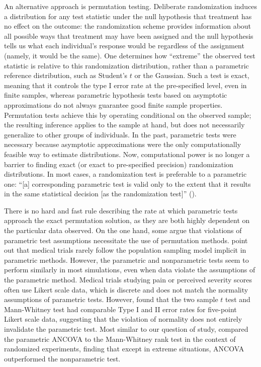 \documentclass[11pt]{article}
\newcommand{\todo}[1]{{\color{red}{TO DO: \sc #1}}}
\begin{document}
An alternative approach is permutation testing. \todo{citations: fisher 1935, pitman 1937 and 1938}
Deliberate randomization induces a distribution for any test statistic under the null hypothesis that treatment has no effect on the outcome:
the randomization scheme provides information about all possible ways that treatment may have been assigned 
and the null hypothesis tells us what each individual's response would be regardless of the assignment (namely, it would be the same).
One determines how ``extreme'' the observed test statistic is relative to this randomization distribution, rather than a parametric reference distribution, such as Student's $t$ or the Gaussian.
Such a test is exact, meaning that it controls the type I error rate at the pre-specified level, even in finite samples, whereas parametric hypothesis tests based on asymptotic approximations do not always guarantee good finite sample properties.
Permutation tests achieve this by operating conditional on the observed sample; the resulting inference applies to the sample at hand, but does not necessarily generalize to other groups of individuals.
In the past, parametric tests were necessary because asymptotic approximations were the only computationally feasible way to estimate distributions. 
Now, computational power is no longer a barrier to finding exact (or exact to pre-specified precision) randomization distributions.
In most cases, a randomization test is preferable to a parametric one:
``[a] corresponding parametric test is valid only to the extent that it results in the same statistical decision [as the randomization test]'' (\cite{bradley_distribution_1968}).

There is no hard and fast rule describing the rate at which parametric tests approach the exact permutation solution, as they are both highly dependent on the particular data observed.
On the one hand, some argue that violations of parametric test assumptions necessitate the use of permutation methods.
\citet{ludbrook_why_1998} point out that medical trials rarely follow the population sampling model implicit in parametric methods.
However, the parametric and nonparametric tests seem to perform similarly in most simulations, even when data violate the assumptions of the parametric method.
Medical trials studying pain or perceived severity scores often use Likert scale data, which is discrete and does not match the normality assumptions of parametric tests.
However, \citet{winter_five-point_2010} found that the two sample $t$ test and Mann-Whitney test had comparable Type I and II error rates for five-point Likert scale data, suggesting that the violation of normality does not entirely invalidate the parametric test.
\todo{what other linear model comparisons have people done?}
Most similar to our question of study, \citet{vickers_parametric_2005} compared the parametric ANCOVA to the Mann-Whitney rank test in the context of randomized experiments, finding that except in extreme situations, ANCOVA outperformed the nonparametric test.
\end{document}
